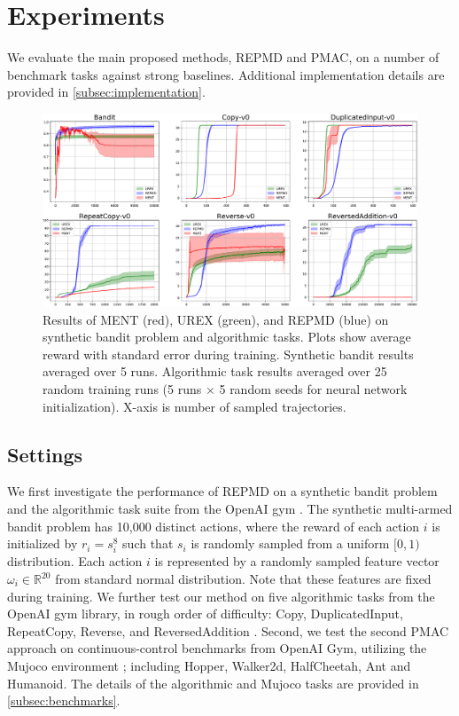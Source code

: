 
\section{Experiments}
\label{sec:experiments}

We evaluate the main proposed methods, REPMD and PMAC,
on a number of benchmark tasks
against strong baselines.
Additional implementation details are provided in \cref{subsec:implementation}. 

\begin{figure}[t]
\begin{center}
\includegraphics[width=0.75\linewidth]{./fig1.pdf}
\end{center}
\caption{
Results of MENT (red), UREX (green), and REPMD (blue) on synthetic bandit
problem and algorithmic tasks.
Plots show average reward with standard error during training.
Synthetic bandit results averaged over 5 runs.
Algorithmic task results averaged over 25 random training runs
(5 runs $\times$ 5 random seeds for neural network initialization).
X-axis is number of sampled trajectories.
} 
\label{fig:results}
\end{figure}

\subsection{Settings}
\label{subsec:tasks}

We first investigate the performance of REPMD on a synthetic bandit problem
and the algorithmic task suite from the OpenAI gym %
\citep{brockman2016openai}.
The synthetic multi-armed bandit problem has 10,000 distinct actions,
where
the reward of each action $i$ is initialized by $r_i = s_i^{8}$
such that
$s_i$ is randomly sampled from a uniform $[0,1)$ distribution.
Each action $i$ is represented by a randomly sampled feature vector
$\omega_i\in \mathbb{R}^{20}$ from standard normal distribution.
Note that these features are fixed during training.
We further test our method on five algorithmic tasks from the OpenAI gym
library, in rough order of difficulty:
Copy, DuplicatedInput, RepeatCopy, Reverse, and ReversedAddition
\citep{brockman2016openai}.
%
Second, we test the second PMAC approach on continuous-control benchmarks
from OpenAI Gym, utilizing the Mujoco environment
\citep{brockman2016openai,todorov2012mujoco};
including Hopper, Walker2d, HalfCheetah, Ant and Humanoid.
The details of the algorithmic and Mujoco tasks are provided in
\cref{subsec:benchmarks}. 

